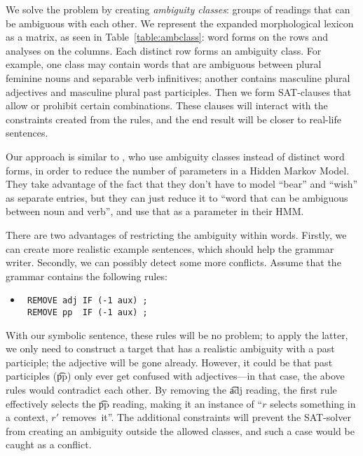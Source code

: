 {{We solve the problem by creating \emph{ambiguity classes}: groups of
readings that can be ambiguous with each other.  We represent the
expanded morphological lexicon as a matrix, as seen in
Table~\ref{table:ambclass}: word forms on the rows and analyses on the
columns. Each distinct row forms an ambiguity class. For example, one
class may contain words that are ambiguous between plural feminine
nouns and separable verb infinitives; another contains masculine
plural adjectives and masculine plural past participles.  Then we form
SAT-clauses that allow or prohibit certain combinations. These clauses
will interact with the constraints created from the rules, and the end
result will be closer to real-life sentences.

Our approach is similar to \citet{cutting_etal92}, who use ambiguity
classes instead of distinct word forms, in order to reduce the number
of parameters in a Hidden Markov Model. They take advantage of the
fact that they don't have to model ``bear'' and ``wish'' as separate
entries, but they can just reduce it to ``word that can be ambiguous
between noun and verb'', and use that as a parameter in their HMM.

There are two advantages of restricting the ambiguity within words.
Firstly, we can create more realistic example sentences, which should help the grammar writer.
Secondly, we can possibly detect some more conflicts. Assume that the grammar contains the following rules:

 \begin{itemize}
 \item[]
\begin{verbatim}
 REMOVE adj IF (-1 aux) ;
 REMOVE pp  IF (-1 aux) ;
 \end{verbatim}
 \end{itemize}

 With our symbolic sentence, these rules will be no problem; to apply the latter, we only need to construct a target that has a realistic ambiguity with a past participle; the adjective will be gone already.
However, it could be that past participles (\t{pp}) only ever get confused with adjectives---in that case, the above rules would contradict each other.
 By removing the \t{adj} reading, the first rule effectively selects the \t{pp} reading, making it an instance of ``$r$ selects something in a context, $r'$ removes~it''.
The additional constraints will prevent the SAT-solver from creating an ambiguity outside the allowed classes, and such a case would be caught as a conflict.

}}
